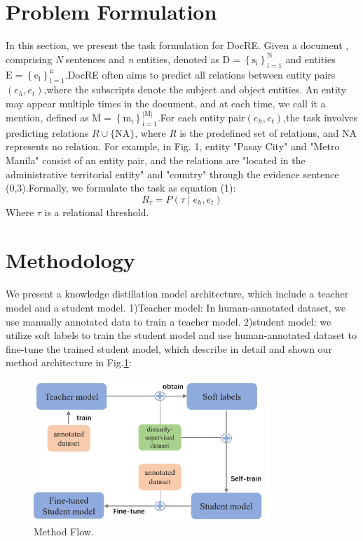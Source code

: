\documentclass[preprint,12pt]{elsarticle}
\begin{document}
\section{Problem Formulation}
In this section, we present the task formulation for DocRE.  Given a document , comprising \emph{N} sentences and \emph{n} entities, denoted as $\mathrm{D}=\left\{\mathrm{s}_{\mathrm{i}}\right\}_{\mathrm{i}=1}^{\mathrm{N}}$ and entities $\mathrm{E}=\left\{\mathrm{e}_{\mathrm{i}}\right\}_{\mathrm{i}=1}^{\mathrm{n}}$.DocRE often aims to predict all relations between entity pairs $(e_h,e_t)$,where the subscripts denote the subject and object entities. An entity may appear multiple times in the document, and at each time, we call it a mention, defined as $\mathrm{M}=\left\{\mathrm{m}_{\mathrm{i}}\right\}_{\mathrm{i}=1}^{\mathrm{|M|}}$.For each entity pair$(e_h,e_t)$,the task involves predicting relations $R \cup\{\mathrm{NA}\}$, where \emph{R} is the predefined set of relations, and $\mathrm{NA}$ represents no relation. For example, in Fig. 1, entity "Pasay City" and "Metro Manila" consist of an entity pair, and the relations are "located in the administrative territorial entity" and "country" through the evidence sentence (0,3).Formally, we formulate the task as equation (1):
\begin{equation}
R_\tau=P(\tau \mid e_h,e_t)\label{eq1}
\end{equation}
Where $\tau$ is a relational threshold.

\section{Methodology}\label{sec4}
We present a knowledge distillation model architecture, which include a teacher model and a student model. 1)Teacher model: In human-annotated dataset, we use manually annotated data to train a teacher model. 2)student model: we utilize soft labels to train the student model and use human-annotated dataset to fine-tune the trained student model, which describe in detail and shown our method architecture in Fig.\ref{fig.2}: 
\begin{figure}[htbp]
\centering
\includegraphics[width=3.5in]{./Flow.png}
\caption{Method Flow.}
\label{fig.2}
\end{figure}
\end{document}
